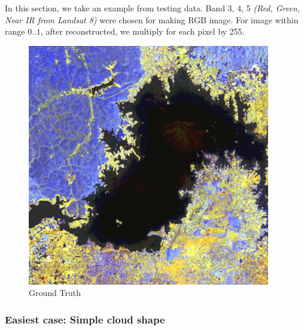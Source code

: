In this section, we take an example from testing data. Band 3, 4, 5 \textit{(Red, Green, Near IR from Landsat 8)} were chosen for making RGB image. For image within range $0..1$, after reconstructed, we multiply for each pixel by 255.
\begin{figure}[h!]
	\includegraphics[width=0.7\linewidth]{figures/groud_truth.png}
	\centering
	\caption{Ground Truth}
\end{figure}

\subsubsection{Easiest case: Simple cloud shape}

